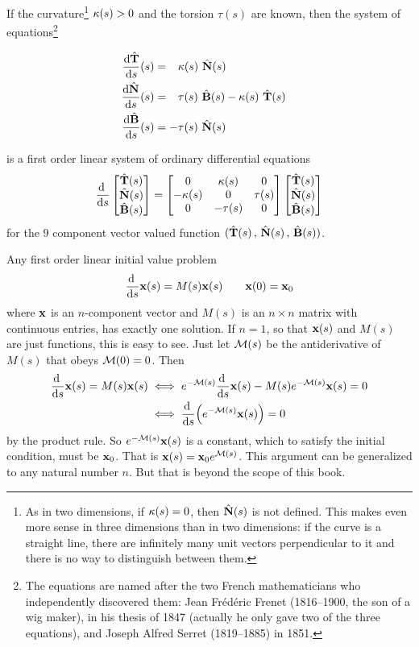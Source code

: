 If the curvature\footnote{As in two dimensions, if $\kappa(s)=0$, then
$\hat{\mathbf{N}}(s)$ is not defined. This makes even more sense in three dimensions
than in two dimensions: if the curve is a straight line, there are 
infinitely many unit vectors perpendicular to it and there is no way to 
distinguish between them.} $\kappa(s)>0$ 
and the torsion $\tau(s)$ are known,
then the system of equations\footnote{The equations are named after 
the two French mathematicians who independently discovered them: 
Jean Fr\'ed\'eric Frenet (1816--1900, the son of a wig maker), 
in his thesis of 1847
(actually he only gave two of the three equations), and 
Joseph Alfred Serret (1819--1885) in 1851. 
}
\begin{impeqn}\label{eqn:FrenetSerret}
\begin{align*}
\diff{\hat\vT}{s}(s)&=\phantom{-}\ka(s)\ \hat\vN(s)\cr
\diff{\hat\vN}{s}(s)&=\phantom{-}\tau(s)\ \hat\vB(s)-\ka(s)\ \hat\vT(s)\cr
\diff{\hat\vB}{s}(s)&=-\tau(s)\ \hat\vN(s)\cr
\end{align*}
\end{impeqn}\noindent
is a first order linear system of ordinary differential equations 
\begin{align*}
\diff{}{s}
\left[ \begin{matrix}\hat\vT(s)\\ \hat\vN(s)\\ \hat\vB(s)\end{matrix} \right]
=\left[\begin{matrix} 0      & \ka(s) & 0\\
              -\ka(s) &  0     &\tau(s) \\
              0       &-\tau(s)  & 0 \end{matrix}\right]
\left[\begin{matrix}\hat\vT(s)\\ \hat\vN(s)\\ \hat\vB(s)\end{matrix}\right]
\end{align*}
for the $9$ component vector valued function
$(\hat{\mathbf{T}}(s)\,,\,\hat{\mathbf{N}}(s)\,,\,\hat{\mathbf{B}}(s))$. 

Any first order linear initial 
value problem
\begin{equation*}
\diff{}{s}\vx(s) = M(s) \vx(s)\qquad
\vx(0)=\vx_0
\end{equation*}
where $\mathbf{x}$ is an $n$-component vector and $M(s)$ is an $n\times n$ matrix with continuous entries, has exactly one solution. If $n=1$, so that 
$\mathbf{x}(s)$ and $M(s)$ are just functions, this is easy to see. Just 
let $\mathcal{M}(s)$ be the antiderivative of $M(s)$ that obeys $\mathcal{M}(0)=0$. Then
\begin{align*}
\diff{}{s}\vx(s) = M(s) \vx(s)
&\iff e^{-\cM(s)}\diff{}{s}\vx(s) - M(s) e^{-\cM(s)} \vx(s)=0 \\
&\iff \diff{}{s}\Big(e^{-\cM(s)}\vx(s)\Big) = 0
\end{align*}
by the product rule. So $e^{-\mathcal{M}(s)}\mathbf{x}(s)$ is a constant, which to satisfy 
the initial condition, must be $\mathbf{x}_0$. That is $\mathbf{x}(s) = \mathbf{x}_0 e^{\mathcal{M}(s)}$.
This argument can be generalized to any natural number $n$. But that is 
beyond the scope of this book.


